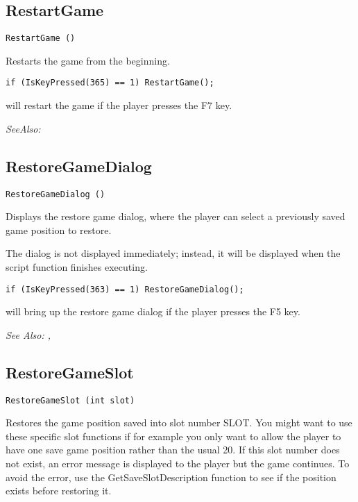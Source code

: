 \subsection{RestartGame}\label{RestartGame}%

\begin{verbatim}
RestartGame ()
\end{verbatim}
Restarts the game from the beginning.

\begin{verbatim}
if (IsKeyPressed(365) == 1) RestartGame();
\end{verbatim}
will restart the game if the player presses the F7 key.

\it{SeeAlso:} 


\subsection{RestoreGameDialog}\label{RestoreGameDialog}%

\begin{verbatim}
RestoreGameDialog ()
\end{verbatim}
Displays the restore game dialog, where the player can select a previously
saved game position to restore.

The dialog is not displayed immediately; instead, it will be displayed when
the script function finishes executing.


\begin{verbatim}
if (IsKeyPressed(363) == 1) RestoreGameDialog();
\end{verbatim}
will bring up the restore game dialog if the player presses the F5 key.

\it{See Also:} , 


\subsection{RestoreGameSlot}\label{RestoreGameSlot}%

\begin{verbatim}
RestoreGameSlot (int slot)
\end{verbatim}
Restores the game position saved into slot number SLOT. You might want to
use these specific slot functions if for example you only want to allow the
player to have one save game position rather than the usual 20. If this slot
number does not exist, an error message is displayed to the player but the
game continues. To avoid the error, use the GetSaveSlotDescription function
to see if the position exists before restoring it.

